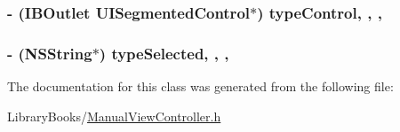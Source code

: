 \subsubsection[{type\+Control}]{\setlength{\rightskip}{0pt plus 5cm}-\/ (I\+B\+Outlet U\+I\+Segmented\+Control$\ast$) type\+Control\hspace{0.3cm}{\ttfamily [read]}, {\ttfamily [write]}, {\ttfamily [nonatomic]}, {\ttfamily [weak]}}\label{interface_manual_view_controller_a3ed5cace841a47be8974104d6c12d708}
\hypertarget{interface_manual_view_controller_a62433952d153e6ec83ab6b5abe6e9355}{}
\subsubsection[{type\+Selected}]{\setlength{\rightskip}{0pt plus 5cm}-\/ (N\+S\+String$\ast$) type\+Selected\hspace{0.3cm}{\ttfamily [read]}, {\ttfamily [write]}, {\ttfamily [atomic]}, {\ttfamily [strong]}}\label{interface_manual_view_controller_a62433952d153e6ec83ab6b5abe6e9355}


The documentation for this class was generated from the following file\+:\begin{DoxyCompactItemize}
\item 
Library\+Books/\hyperlink{_manual_view_controller_8h}{Manual\+View\+Controller.\+h}\end{DoxyCompactItemize}

